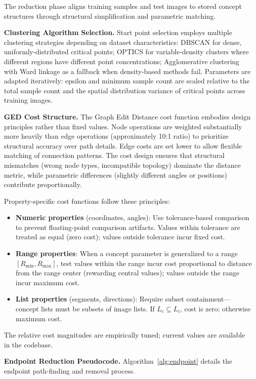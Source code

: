 \documentclass[12pt, a4paper]{article}
\begin{document}
The reduction phase aligns training samples and test images to stored concept structures through structural simplification and parametric matching.

\textbf{Clustering Algorithm Selection.} Start point selection employs multiple clustering strategies depending on dataset characteristics: DBSCAN for dense, uniformly-distributed critical points; OPTICS for variable-density clusters where different regions have different point concentrations; Agglomerative clustering with Ward linkage as a fallback when density-based methods fail. Parameters are adapted iteratively: epsilon and minimum sample count are scaled relative to the total sample count and the spatial distribution variance of critical points across training images.

\textbf{GED Cost Structure.} The Graph Edit Distance cost function embodies design principles rather than fixed values. Node operations are weighted substantially more heavily than edge operations (approximately 10:1 ratio) to prioritize structural accuracy over path details. Edge costs are set lower to allow flexible matching of connection patterns. The cost design ensures that structural mismatches (wrong node types, incompatible topology) dominate the distance metric, while parametric differences (slightly different angles or positions) contribute proportionally.

Property-specific cost functions follow these principles:
\begin{itemize}
\item \textbf{Numeric properties} (coordinates, angles): Use tolerance-based comparison to prevent floating-point comparison artifacts. Values within tolerance are treated as equal (zero cost); values outside tolerance incur fixed cost.
\item \textbf{Range properties}: When a concept parameter is generalized to a range $[R_{\min}, R_{\max}]$, test values within the range incur cost proportional to distance from the range center (rewarding central values); values outside the range incur maximum cost.
\item \textbf{List properties} (segments, directions): Require subset containment---concept lists must be subsets of image lists. If $L_c \subseteq L_i$, cost is zero; otherwise maximum cost.
\end{itemize}

The relative cost magnitudes are empirically tuned; current values are available in the codebase.

\textbf{Endpoint Reduction Pseudocode.} Algorithm~\ref{alg:endpoint} details the endpoint path-finding and removal process.
\end{document}

